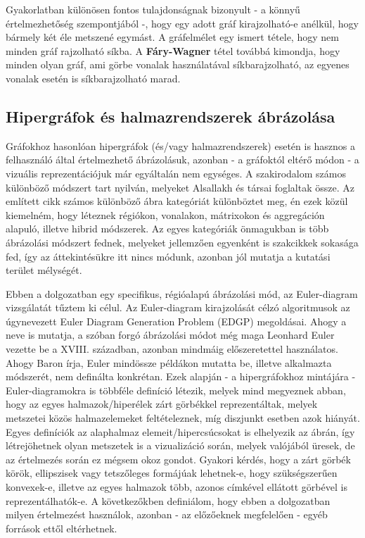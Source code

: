 Gyakorlatban különösen fontos tulajdonságnak bizonyult - a könnyű értelmezhetőség szempontjából -, hogy egy adott gráf kirajzolható-e anélkül, hogy bármely két éle metszené egymást. A gráfelmélet egy ismert tétele, hogy nem minden gráf rajzolható síkba. A \textbf{Fáry-Wagner} tétel továbbá kimondja, hogy minden olyan gráf, ami görbe vonalak használatával síkbarajzolható, az egyenes vonalak esetén is síkbarajzolható marad.

\subsection{Hipergráfok és halmazrendszerek ábrázolása}

Gráfokhoz hasonlóan hipergráfok (és/vagy halmazrendszerek) esetén is hasznos a felhasználó által értelmezhető ábrázolásuk, azonban - a gráfoktól eltérő módon - a vizuális reprezentációjuk már egyáltalán nem egységes. A szakirodalom számos különböző módszert tart nyilván, melyeket Alsallakh és társai foglaltak össze\cite{alsallakah2016_the_state_of_the_art_set_visualization}. Az említett cikk számos különböző ábra kategóriát különböztet meg, én ezek közül kiemelném, hogy léteznek régiókon, vonalakon, mátrixokon és aggregáción alapuló, illetve hibrid módszerek. Az egyes kategóriák önmagukban is több ábrázolási módszert fednek, melyeket jellemzően egyenként is szakcikkek sokasága fed, így az áttekintésükre itt nincs módunk, azonban jól mutatja a kutatási terület mélységét.


Ebben a dolgozatban egy specifikus, régióalapú ábrázolási mód, az Euler-diagram vizsgálatát tűztem ki célul. Az Euler-diagram kirajzolását célzó algoritmusok az úgynevezett Euler Diagram Generation Problem (EDGP) megoldásai. Ahogy a neve is mutatja, a szóban forgó ábrázolási módot még maga Leonhard Euler vezette be a XVIII. században, azonban mindmáig előszeretettel használatos. Ahogy Baron írja\cite{euler_early}, Euler mindössze példákon mutatta be, illetve alkalmazta módszerét, nem definálta konkrétan. Ezek alapján - a hipergráfokhoz mintájára - Euler-diagramokra is többféle definíció létezik, melyek mind megyeznek abban, hogy az egyes halmazok/hiperélek zárt görbékkel reprezentáltak, melyek metszetei közös halmazelemeket feltételeznek, míg diszjunkt esetben azok hiányát. Egyes definíciók az alaphalmaz elemeit/hipercsúcsokat is elhelyezik az ábrán, így létrejöhetnek olyan metszetek is a vizualizáció során, melyek valójából üresek, de az értelmezés során ez mégsem okoz gondot. Gyakori kérdés, hogy a zárt görbék körök, ellipszisek vagy tetszőleges formájúak lehetnek-e, hogy szükségszerűen konvexek-e, illetve az egyes halmazok több, azonos címkével ellátott görbével is reprezentálhatók-e. A következőkben definiálom, hogy ebben a dolgozatban milyen értelmezést használok, azonban - az előzőeknek megfelelően - egyéb források ettől eltérhetnek.

